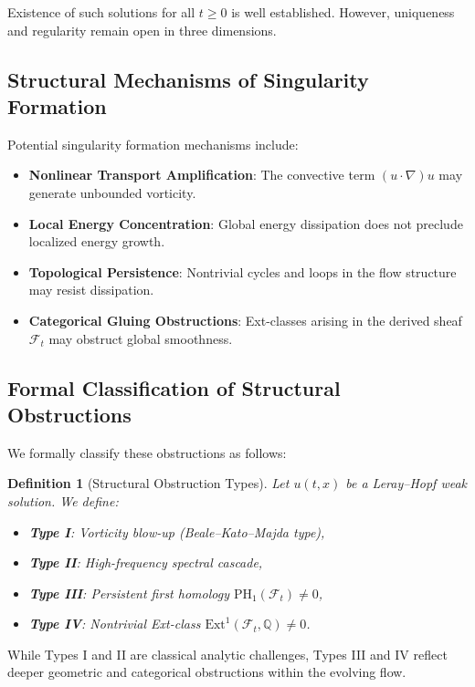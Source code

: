 \documentclass[11pt]{article}
\newtheorem{definition}[theorem]{Definition}
\begin{document}
Existence of such solutions for all \( t \geq 0 \) is well established. However, uniqueness and regularity remain open in three dimensions.

\subsection{Structural Mechanisms of Singularity Formation}

Potential singularity formation mechanisms include:
\begin{itemize}
  \item \textbf{Nonlinear Transport Amplification}: The convective term \( (u \cdot \nabla)u \) may generate unbounded vorticity.
  \item \textbf{Local Energy Concentration}: Global energy dissipation does not preclude localized energy growth.
  \item \textbf{Topological Persistence}: Nontrivial cycles and loops in the flow structure may resist dissipation.
  \item \textbf{Categorical Gluing Obstructions}: Ext-classes arising in the derived sheaf \( \mathcal{F}_t \) may obstruct global smoothness.
\end{itemize}

\subsection{Formal Classification of Structural Obstructions}

We formally classify these obstructions as follows:

\begin{definition}[Structural Obstruction Types]
Let \( u(t,x) \) be a Leray–Hopf weak solution. We define:

\begin{itemize}
  \item \textbf{Type I}: Vorticity blow-up (Beale–Kato–Majda type),
  \item \textbf{Type II}: High-frequency spectral cascade,
  \item \textbf{Type III}: Persistent first homology \( \mathrm{PH}_1(\mathcal{F}_t) \neq 0 \),
  \item \textbf{Type IV}: Nontrivial Ext-class \( \mathrm{Ext}^1(\mathcal{F}_t, \mathbb{Q}) \neq 0 \).
\end{itemize}
\end{definition}

While Types I and II are classical analytic challenges, Types III and IV reflect deeper geometric and categorical obstructions within the evolving flow.
\end{document}
